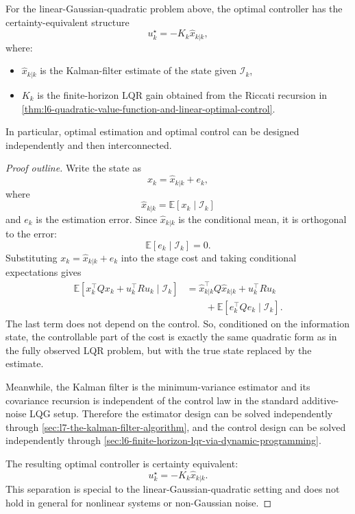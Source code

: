 \begin{theorem}\label{thm:l8-separation-principle}
	For the linear-Gaussian-quadratic problem above, the optimal controller has the certainty-equivalent structure
	\[
		u_k^\star = -K_k \hat x_{k|k},
	\]
	where:
	\begin{itemize}
		\item $\hat x_{k|k}$ is the Kalman-filter estimate of the state given $\mathcal{I}_k$,
		\item $K_k$ is the finite-horizon LQR gain obtained from the Riccati recursion in \autoref{thm:l6-quadratic-value-function-and-linear-optimal-control}.
	\end{itemize}
	In particular, optimal estimation and optimal control can be designed independently and then interconnected.
\end{theorem}
\begin{proof}[Proof outline]
	Write the state as
	\[
		x_k = \hat x_{k|k} + e_k,
	\]
	where
	\[
		\hat x_{k|k} = \mathbb{E}[x_k \mid \mathcal{I}_k]
	\]
	and $e_k$ is the estimation error. Since $\hat x_{k|k}$ is the conditional mean, it is orthogonal to the error:
	\[
		\mathbb{E}[e_k \mid \mathcal{I}_k]=0.
	\]
	Substituting $x_k=\hat x_{k|k}+e_k$ into the stage cost and taking conditional expectations gives
	\begin{align*}
		\mathbb{E}[x_k^\top Q x_k + u_k^\top R u_k \mid \mathcal{I}_k]
		&=
		\hat x_{k|k}^\top Q \hat x_{k|k} + u_k^\top R u_k \\
		&\qquad + \mathbb{E}[e_k^\top Q e_k \mid \mathcal{I}_k].
	\end{align*}
	The last term does not depend on the control. So, conditioned on the information state, the controllable part of the cost is exactly the same quadratic form as in the fully observed LQR problem, but with the true state replaced by the estimate.

	Meanwhile, the Kalman filter is the minimum-variance estimator and its covariance recursion is independent of the control law in the standard additive-noise LQG setup. Therefore the estimator design can be solved independently through \autoref{sec:l7-the-kalman-filter-algorithm}, and the control design can be solved independently through \autoref{sec:l6-finite-horizon-lqr-via-dynamic-programming}.

	The resulting optimal controller is certainty equivalent:
	\[
		u_k^\star = -K_k \hat x_{k|k}.
	\]
	This separation is special to the linear-Gaussian-quadratic setting and does not hold in general for nonlinear systems or non-Gaussian noise.
\end{proof}

